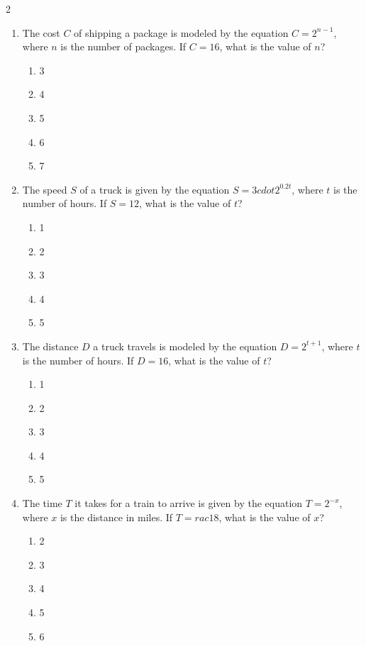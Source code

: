 \documentclass[10pt]{article}
\begin{document}
\begin{multicols}{2}
\begin{enumerate}[label=\textbf{Q\arabic*.}, leftmargin=*, itemsep=6pt, parsep=0pt]
  \item \small The cost $C$ of shipping a package is modeled by the equation $C = 2^{n-1}$, where $n$ is the number of packages. If $C = 16$, what is the value of $n$?
  \begin{enumerate}[label=(\Alph*), leftmargin=0.6cm, nosep, itemsep=2pt]
    \item 3
    \item 4
    \item 5
    \item 6
    \item 7
  \end{enumerate}

  \item \small The speed $S$ of a truck is given by the equation $S = 3 cdot 2^{0.2t}$, where $t$ is the number of hours. If $S = 12$, what is the value of $t$?
  \begin{enumerate}[label=(\Alph*), leftmargin=0.6cm, nosep, itemsep=2pt]
    \item 1
    \item 2
    \item 3
    \item 4
    \item 5
  \end{enumerate}

  \item \small The distance $D$ a truck travels is modeled by the equation $D = 2^{t+1}$, where $t$ is the number of hours. If $D = 16$, what is the value of $t$?
  \begin{enumerate}[label=(\Alph*), leftmargin=0.6cm, nosep, itemsep=2pt]
    \item 1
    \item 2
    \item 3
    \item 4
    \item 5
  \end{enumerate}

  \item \small The time $T$ it takes for a train to arrive is given by the equation $T = 2^{-x}$, where $x$ is the distance in miles. If $T = rac{1}{8}$, what is the value of $x$?
  \begin{enumerate}[label=(\Alph*), leftmargin=0.6cm, nosep, itemsep=2pt]
    \item 2
    \item 3
    \item 4
    \item 5
    \item 6
  \end{enumerate}


\end{enumerate}
\end{multicols}
\end{document}
